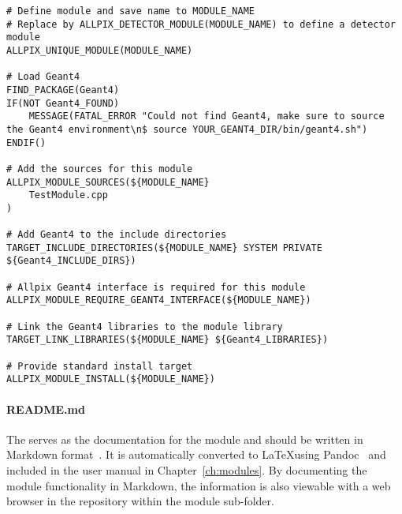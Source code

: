\begin{verbatim}
# Define module and save name to MODULE_NAME
# Replace by ALLPIX_DETECTOR_MODULE(MODULE_NAME) to define a detector module
ALLPIX_UNIQUE_MODULE(MODULE_NAME)

# Load Geant4
FIND_PACKAGE(Geant4)
IF(NOT Geant4_FOUND)
    MESSAGE(FATAL_ERROR "Could not find Geant4, make sure to source the Geant4 environment\n$ source YOUR_GEANT4_DIR/bin/geant4.sh")
ENDIF()

# Add the sources for this module
ALLPIX_MODULE_SOURCES(${MODULE_NAME}
    TestModule.cpp
)

# Add Geant4 to the include directories
TARGET_INCLUDE_DIRECTORIES(${MODULE_NAME} SYSTEM PRIVATE ${Geant4_INCLUDE_DIRS})

# Allpix Geant4 interface is required for this module
ALLPIX_MODULE_REQUIRE_GEANT4_INTERFACE(${MODULE_NAME})

# Link the Geant4 libraries to the module library
TARGET_LINK_LIBRARIES(${MODULE_NAME} ${Geant4_LIBRARIES})

# Provide standard install target
ALLPIX_MODULE_INSTALL(${MODULE_NAME})
\end{verbatim}

\paragraph{README.md}
The  serves as the documentation for the module and should be written in Markdown format~\cite{markdown}.
It is automatically converted to \LaTeX using Pandoc~\cite{pandoc} and included in the user manual in Chapter~\ref{ch:modules}.
By documenting the module functionality in Markdown, the information is also viewable with a web browser in the repository within the module sub-folder.

